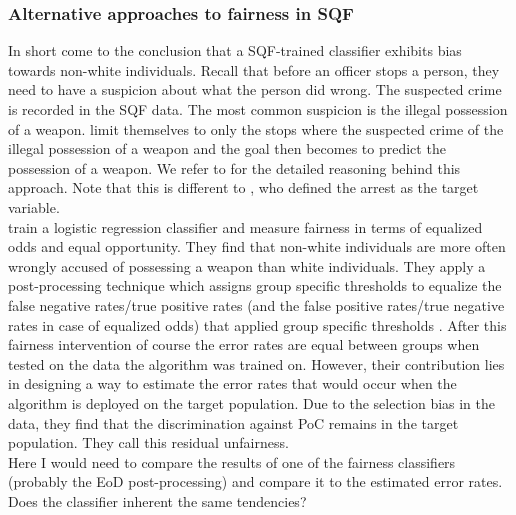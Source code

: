 \subsubsection*{Alternative approaches to fairness in SQF}
In short \cite{kallus2018} come to the conclusion that a SQF-trained classifier exhibits bias towards non-white individuals.
Recall that before an officer stops a person, they need to have a suspicion about what the person did wrong. The suspected crime is recorded in the SQF data. The most common suspicion is the illegal possession of a weapon. \cite{kallus2018} limit themselves to only the stops where the suspected crime of the illegal possession of a weapon and the goal then becomes to predict the possession of a weapon. We refer to \cite{goel2016} for the detailed reasoning behind this approach.
Note that this is different to \cite{Badr2022DTFANSP}, who defined the arrest as the target variable.\\

\cite{kallus2018} train a logistic regression classifier and measure fairness in terms of equalized odds and equal opportunity. They find that non-white individuals are more often wrongly accused of possessing a weapon than white individuals. They apply a post-processing technique which assigns group specific thresholds to equalize the false negative rates/true positive rates (and the false positive rates/true negative rates in case of equalized odds) that applied group specific thresholds \cite{hardt2016}.
After this fairness intervention of course the error rates are equal between groups when tested on the data the algorithm was trained on. However, their contribution lies in designing a way to estimate the error rates that would occur when the algorithm is deployed on the target population. Due to the selection bias in the data, they find that the discrimination against PoC remains in the target population. They call this residual unfairness.\\
Here I would need to compare the results of one of the fairness classifiers (probably the EoD post-processing) and compare it to the estimated error rates. Does the classifier inherent the same tendencies?


